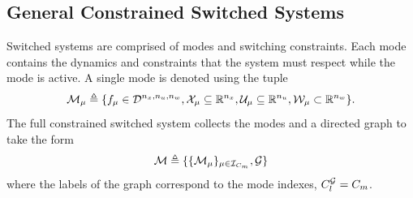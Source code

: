 \subsection{General Constrained Switched Systems}
Switched systems are comprised of modes and switching constraints. Each mode contains the dynamics and constraints that the system must respect while the mode is active. A single mode is denoted using the tuple
\begin{equation*}
\mode{\modeidx}\triangleq\{f_\modeidx\in \mathcal{D}^{\nx,\nu,\nw}, \xcon[\modeidx]\subseteq\real^\nx, \ucon[\modeidx]\subseteq\real^\nu, \wcon[\modeidx]\subset\real^\nw\}.
\end{equation*}
The full constrained switched system collects the modes and a directed graph to take the form
\begin{equation*}
\modes\triangleq\{\{\mode{\modeidx}\}_{\modeidx\in\idxset{\nummodes}}, \graph\}
\end{equation*}
where the labels of the graph correspond to the mode indexes, $\gnumlabels=\nummodes$.

